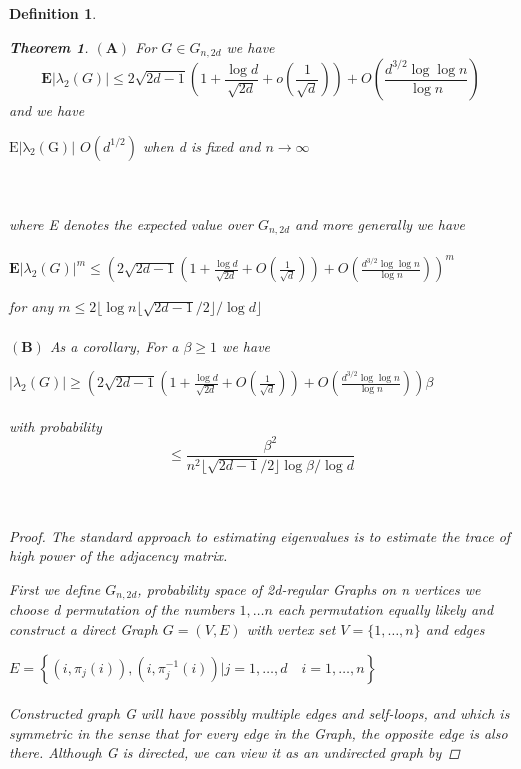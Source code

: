 \documentclass[oneside]{book}
\newtheorem{theorem}{Theorem}[section]
\newtheorem{mydef}{Definition}
\begin{document}
\begin{mydef}
        
     \begin{theorem} \label{t:13}
     $ \left(\mathbf{A} \right) $ For $G \in{G}_{n, 2d}$ we have
$$
\mathbf{E}\left|\lambda_{2}(G)\right| \leq 2 \sqrt{2 d-1}\left(1+\frac{\log d}{\sqrt{2 d}}+o\left(\frac{1}{\sqrt{d}}\right)\right)+O\left(\frac{d^{3 / 2} \log \log n}{\log n}\right)
$$  and we have \begin{center}
     $\mathrm{E|\lambda_{2}(G)|}$ \leq $O(d^{1/2})$ when d is fixed and $n\rightarrow \infty
     $
\end{center}
 \\\\
  where E denotes the expected
value over ${G}_{n, 2d}$      and more generally we have\\\\ $\mathbf{E}\left|\lambda_{2}(G)\right|^{m} \leq\left(2 \sqrt{2 d-1}\left(1+\frac{\log d}{\sqrt{2 d}}+O\left(\frac{1}{\sqrt{d}}\right)\right)+O\left(\frac{d^{3 / 2} \log \log n}{\log n}\right)\right)^{m}$ \par
for any $ m \leq 2\lfloor\log n\lfloor\sqrt{2 d-1} / 2\rfloor / \log d\rfloor$\\\\
$ \left(\mathbf{B}\right) $   As a corollary, For a $\beta\geq 1$ we have \par
$\left|\lambda_{2}(G)\right| \geq\left(2 \sqrt{2 d-1}\left(1+\frac{\log d}{\sqrt{2 d}}+O\left(\frac{1}{\sqrt{d}}\right)\right)+O\left(\frac{d^{3 / 2} \log \log n}{\log n}\right)\right) \beta$\\\\
 with probability
$$
\leq \frac{\beta^{2}}{n^{2}\lfloor\sqrt{2 d-1} / 2\rfloor \log \beta / \log d}
$$   \\\\
 \end{theorem}
\begin{proof}
 The standard approach to estimating eigenvalues is to estimate the trace of high power of the adjacency matrix.\par
First we define ${G}_{n, 2d}$, probability space of 2d-regular Graphs on n vertices    we choose d permutation of the numbers ${1,\ldots n}$ each permutation equally likely and construct a direct Graph $G = (V,E) $ with  vertex set $V=\{1, \ldots, n\}$ and edges\par
$E=\left\{\left(i, \pi_{j}(i)\right),\left(i, \pi_{j}^{-1}(i)\right) | j=1, \ldots, d \quad i=1, \ldots, n\right\}$ \\\\
Constructed graph G will have possibly multiple edges and self-loops, and which is symmetric in the sense that for every edge in the Graph, the opposite edge is also there. Although G is directed, we can view it as an undirected graph by

\end{proof}
\end{mydef}
\end{document}
